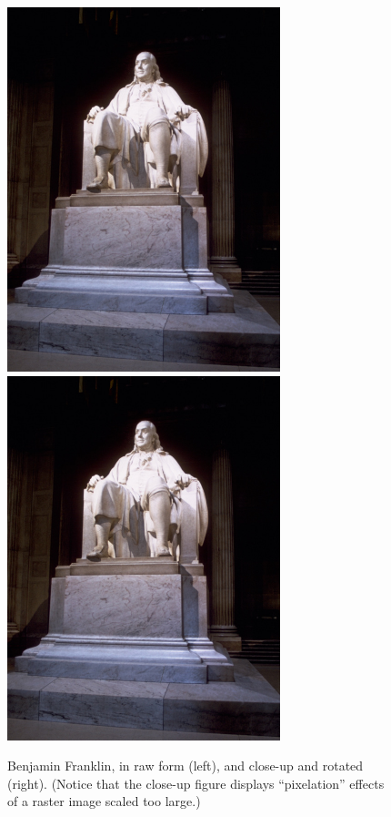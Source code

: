 \begin{figure}
\begin{center}
\includegraphics{figures/ben}
\includegraphics[viewport=.9in 2.1in 1.15in 2.35in,clip,
    scale=10.67,angle=90]{figures/ben}
\end{center}
\caption{Benjamin Franklin, in raw form (left), and close-up and
  rotated (right).  (Notice that the close-up figure displays
  ``pixelation'' effects of a raster image scaled too large.)}
\label{franklin}
\end{figure}

